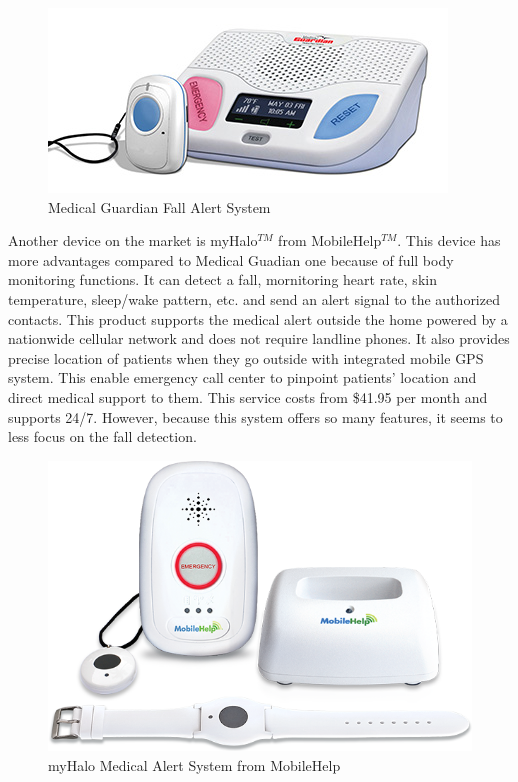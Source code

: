 \documentclass[letterpaper,12pt,titlepage,oneside,final]{book}
\begin{document}
 \begin{figure}[h!]
	\centering
	\includegraphics[scale=0.7]{medical-guardian-fall-alert-system}
	\caption{Medical Guardian Fall Alert System\cite{figure_guardian}}
\end{figure}
  
Another device on the market is myHalo$^{TM}$ from MobileHelp$^{TM}$. This device has more advantages compared to Medical Guadian one because of full body monitoring functions. It can detect a fall, mornitoring heart rate, skin temperature, sleep/wake pattern, etc. and send an alert signal to the authorized contacts. This product supports the medical alert outside the home powered by a nationwide cellular network and does not require landline phones. It also provides precise location of patients when they go outside with integrated mobile GPS system. This enable emergency call center to pinpoint patients' location and direct medical support to them. This service costs from \$41.95 per month and supports 24/7. However, because this system offers so many features, it seems to less focus on the fall detection. 

 \begin{figure}[h!]
	\centering
	\includegraphics[scale=0.5]{mobile-help}
	\caption{myHalo Medical Alert System from MobileHelp\texttrademark\cite{myHalo}}
\end{figure}
\end{document}
